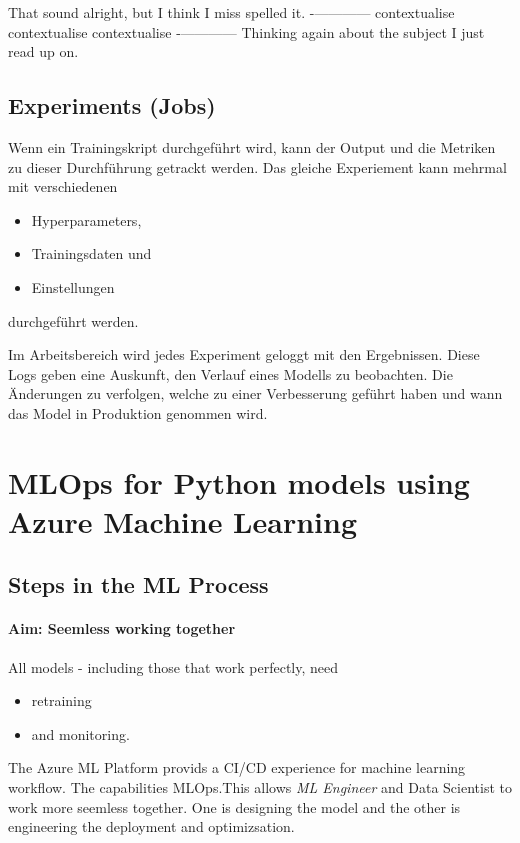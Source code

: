 That sound alright, but I think I miss spelled it.
-————
contextualise
contextualise
contextualise
-————
Thinking again about the subject I just read up on.
 
\subsection{Experiments (Jobs)}


Wenn ein Trainingskript durchgeführt wird, kann der Output und die Metriken zu dieser Durchführung getrackt werden. Das gleiche Experiement kann mehrmal mit verschiedenen 
\begin{itemize}
	\item Hyperparameters,
	\item Trainingsdaten und
	\item Einstellungen 
\end{itemize}
durchgeführt werden. 

Im Arbeitsbereich wird jedes Experiment geloggt mit den Ergebnissen. Diese Logs geben eine Auskunft, den Verlauf eines Modells zu beobachten. Die Änderungen zu verfolgen, welche zu einer Verbesserung geführt haben und wann das Model in Produktion genommen wird.




\section{MLOps for Python models using Azure Machine Learning}

\subsection{Steps in the ML Process}
\paragraph{Aim: Seemless working together}

All models - including those that work perfectly, need
\begin{itemize}
	\item retraining 
	\item and monitoring.
\end{itemize}
The Azure ML Platform provids a \gls{CI}/\gls{CD} experience for machine learning workflow. The capabilities \gls{MLOps}.This allows \textit{ML Engineer} and Data Scientist to work more seemless together. One is designing the model and the other is engineering the deployment and optimizsation.

